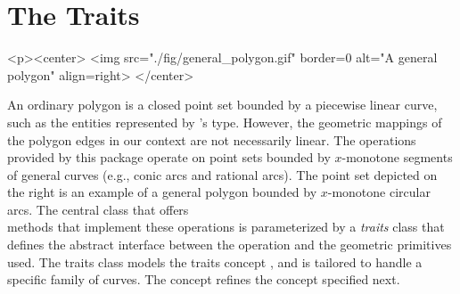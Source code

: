 \section{The Traits}
\label{bso_sec:traits}
\lcTex{%
  \setlength{\widthRight}{1.4cm}
  \setlength{\widthLeft}{\widthLineReal}
  \addtolength{\widthLeft}{-\widthRight}
  \begin{minipage}{\widthLeft}
}
\label{fig:general_polygon}
\begin{ccHtmlOnly}
  <p><center>
    <img src="./fig/general_polygon.gif" border=0 alt="A general polygon" align=right>
  </center>
\end{ccHtmlOnly}
An ordinary polygon is a closed point set bounded by a piecewise linear 
curve, such as the entities represented by \cgal 's  type. 
However, the geometric mappings of the polygon edges in our context are not
necessarily linear. The operations provided by this package operate on point 
sets bounded by $x$-monotone segments of general curves (e.g., conic arcs and 
rational arcs). The point set depicted on the right is an example of a 
general polygon bounded by $x$-monotone circular arcs. The central class 
 that offers
\\
methods that implement these operations is parameterized by a {\em traits}
class that defines the abstract interface between the operation and the 
geometric primitives used. The traits class models the traits concept 
, and is tailored to handle a specific 
family of curves. The concept  refines the 
concept  specified next.

